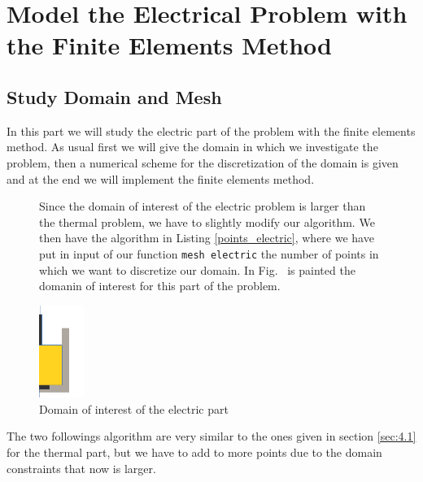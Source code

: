 \section{Model the Electrical Problem with the Finite Elements Method}
\subsection{Study Domain and Mesh}
In this part we will study the electric part of the problem with the finite elements method. As usual first we will give the domain in which we investigate the problem, then a numerical scheme for the discretization of the domain is given and at the end we will implement the finite elements method.

\label{sec:5.1}
\begin{figure}[htbp]
	\begin{minipage}[c]{.5\linewidth}
		Since the domain of interest of the electric problem is larger than the thermal problem, we have to slightly modify our algorithm. We then have the algorithm in Listing \ref{points_electric}, where we have put in input of our function \texttt{mesh electric} the number of points in which we want to discretize our domain. In Fig.~ is painted the domanin of interest for this part of the problem.   
	\end{minipage} \hfill
	\begin{minipage}[c]{.5\linewidth}
		\centering
		\includegraphics[height=3cm]{Images/electric_domain.png}
		\caption{Domain of interest of the electric part}
		\label{figure:electric_domain}
	\end{minipage}
\end{figure}

\bigskip

The two followings algorithm are very similar to the ones given in section \ref{sec:4.1} for the thermal part, but we have to add to more points due to the domain constraints that now is larger.

\bigskip 






